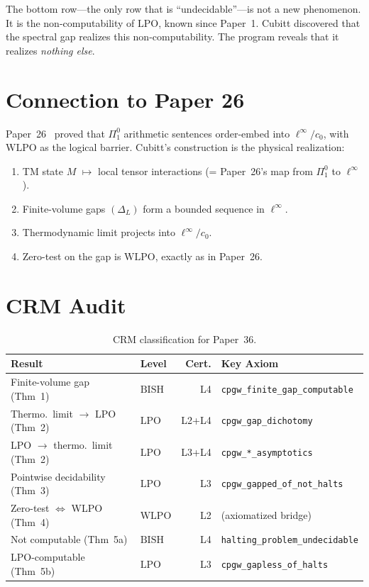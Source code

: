 \documentclass[11pt,a4paper]{article}
\theoremstyle{plain}
\theoremstyle{definition}
\newcommand{\LPO}{\ensuremath{\mathrm{LPO}}}
\newcommand{\WLPO}{\ensuremath{\mathrm{WLPO}}}
\newcommand{\BISH}{\ensuremath{\mathrm{BISH}}}
\begin{document}
The bottom row---the only row that is ``undecidable''---is not a new
phenomenon. It is the non-computability of $\LPO$, known since
Paper~1. Cubitt discovered that the spectral gap realizes this
non-computability. The program reveals that it realizes
\emph{nothing else}.

\section{Connection to Paper 26}\label{sec:paper26}

Paper~26~\cite{Lee26P26} proved that $\Pi^0_1$ arithmetic sentences
order-embed into $\ell^\infty / c_0$, with $\WLPO$ as the logical
barrier. Cubitt's construction is the physical realization:

\begin{enumerate}
  \item TM state $M$ $\mapsto$ local tensor interactions
        (= Paper~26's map from $\Pi^0_1$ to $\ell^\infty$).
  \item Finite-volume gaps $(\Delta_L)$ form a bounded sequence in
        $\ell^\infty$.
  \item Thermodynamic limit projects into $\ell^\infty / c_0$.
  \item Zero-test on the gap is $\WLPO$, exactly as in Paper~26.
\end{enumerate}

\section{CRM Audit}\label{sec:audit}

\begin{table}[ht]
\centering
\caption{CRM classification for Paper~36.}
\label{tab:audit}
\begin{tabular}{@{}llrl@{}}
\toprule
\textbf{Result} & \textbf{Level} & \textbf{Cert.} & \textbf{Key Axiom} \\
\midrule
Finite-volume gap (Thm~1)   & $\BISH$ & L4 & \texttt{cpgw\_finite\_gap\_computable} \\
Thermo.\ limit $\to$ LPO (Thm~2) & $\LPO$ & L2+L4 & \texttt{cpgw\_gap\_dichotomy} \\
LPO $\to$ thermo.\ limit (Thm~2) & $\LPO$ & L3+L4 & \texttt{cpgw\_*\_asymptotics} \\
Pointwise decidability (Thm~3) & $\LPO$ & L3 & \texttt{cpgw\_gapped\_of\_not\_halts} \\
Zero-test $\iff$ WLPO (Thm~4) & $\WLPO$ & L2 & (axiomatized bridge) \\
Not computable (Thm~5a)     & $\BISH$ & L4 & \texttt{halting\_problem\_undecidable} \\
LPO-computable (Thm~5b)     & $\LPO$ & L3 & \texttt{cpgw\_gapless\_of\_halts} \\
\bottomrule
\end{tabular}
\end{table}
\end{document}
